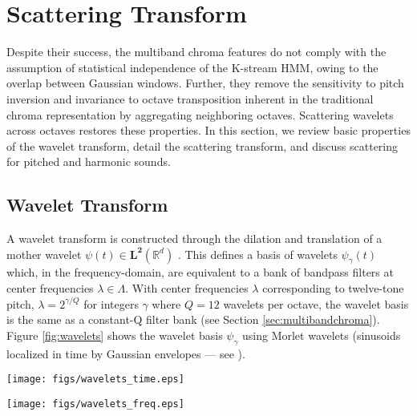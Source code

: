 % 

\section{Scattering Transform}
\label{sec:scattering}

Despite their success, the multiband chroma features do not comply with the assumption of statistical independence of the K-stream HMM, owing to the overlap between Gaussian windows. Further, they remove the sensitivity to pitch inversion and invariance to octave transposition inherent in the traditional chroma representation by aggregating neighboring octaves. Scattering wavelets across octaves restores these properties. In this section, we review basic properties of the wavelet transform, detail the scattering transform, and discuss scattering for pitched and harmonic sounds. 

\subsection{Wavelet Transform}
\label{sec:wavelettransform}

A wavelet transform is constructed through the dilation and translation of a mother wavelet $\psi(t) \in \mathbf{L^2} (\mathbb{R}^d)$ \cite{mallat2012group} \cite{daubechies}. This defines a basis of wavelets $\psi_{\gamma}(t)$ which, in the frequency-domain, are equivalent to a bank of bandpass filters at center frequencies $\lambda \in \Lambda$. With center frequencies $\lambda$ corresponding to twelve-tone pitch, \ie $\lambda = 2^{\gamma/Q}$ for integers $\gamma$ where $Q = 12$ wavelets per octave, the wavelet basis is the same as a constant-Q filter bank (see Section \ref{sec:multibandchroma}). Figure \ref{fig:wavelets} shows the wavelet basis $\psi_{\gamma}$ using Morlet wavelets (sinusoids localized in time by Gaussian envelopes --- see \cite{anden2014deep}).

\begin{figure*}[h!]
\centering
\begin{minipage}{\columnwidth}
	\centering
	\texttt{[image: figs/wavelets\_time.eps]}
\end{minipage}
\begin{minipage}{\columnwidth}
	\centering
	\texttt{[image: figs/wavelets\_freq.eps]}
\end{minipage}
\caption{Morlet Wavelet basis $\psi_{\lambda}$. Top: Wavelets $\psi_{\lambda}(t)$ in time domain for one octave. Bottom: Wavelets $\hat{\psi}_{\gamma}(\omega)$ in frequency domain showing four octaves.}
\label{fig:wavelets}
\end{figure*}

